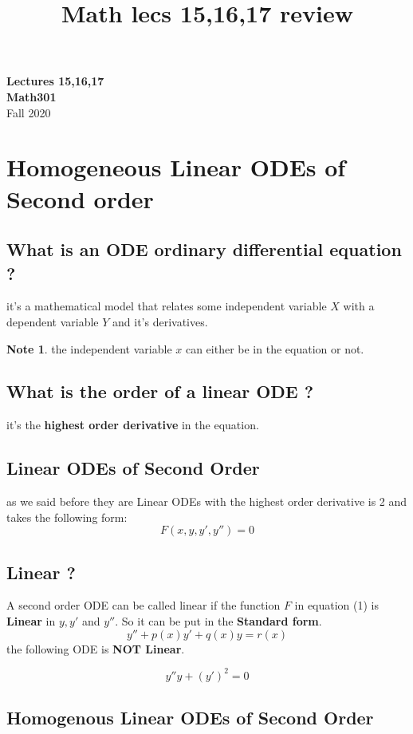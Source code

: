 \documentclass[11pt]{article}
\theoremstyle{definition}
\newtheorem{note}{Note}
\begin{document}
\setcounter{section}{0}
\title{Math lecs 15,16,17 review}

\thispagestyle{empty}
\center
{\LARGE \bf Lectures 15,16,17}\\[0.3cm]
{\large \bf Math301}\\[0.3cm]
Fall 2020

\tableofcontents
\newpage
\section{Homogeneous Linear ODEs of Second order} 
\subsection{What is an ODE ordinary differential equation ?}
it's a mathematical model that relates some independent variable $X$ with a dependent variable $Y$ and it's derivatives.  
\begin{note}
the independent variable $x$ can either be in the equation or not. 
\end{note}
\subsection{What is the order of a linear ODE ?}
it's the \textbf{highest order derivative} in the equation. 
\subsection{Linear ODEs of Second Order}
as we said before they are Linear ODEs with the highest order derivative is 2 and takes the following form: 
\begin{equation}
    F(x,y,y',y'')=0
\end{equation}
\subsection{Linear ?}
A second order ODE can be called linear if the function $F$ in equation (1) is \textbf{Linear} in $y,y'$ and $y''$. So it can be put in the \textbf{Standard form}.
\begin{equation}
    y''+p(x)y'+q(x)y=r(x)
\end{equation}
the following ODE is \textbf{ NOT Linear}.

\begin{equation}
    y''y+(y')^2=0
\end{equation}

\subsection{Homogenous Linear ODEs of Second Order}
\end{document}

